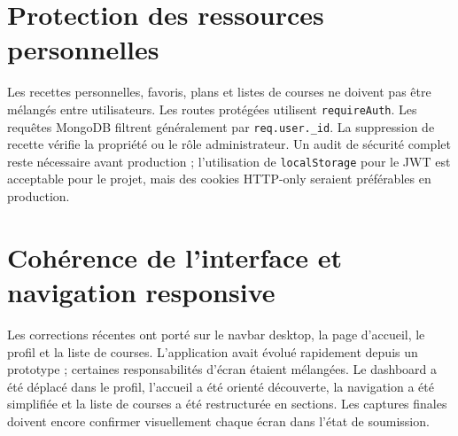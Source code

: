 \documentclass[12pt,a4paper]{report}
\begin{document}
\section{Protection des ressources personnelles}
Les recettes personnelles, favoris, plans et listes de courses ne doivent pas être mélangés entre utilisateurs. Les routes protégées utilisent \texttt{requireAuth}. Les requêtes MongoDB filtrent généralement par \texttt{req.user.\_id}. La suppression de recette vérifie la propriété ou le rôle administrateur. Un audit de sécurité complet reste nécessaire avant production ; l'utilisation de \texttt{localStorage} pour le JWT est acceptable pour le projet, mais des cookies HTTP-only seraient préférables en production.

\section{Cohérence de l'interface et navigation responsive}
Les corrections récentes ont porté sur le navbar desktop, la page d'accueil, le profil et la liste de courses. L'application avait évolué rapidement depuis un prototype ; certaines responsabilités d'écran étaient mélangées. Le dashboard a été déplacé dans le profil, l'accueil a été orienté découverte, la navigation a été simplifiée et la liste de courses a été restructurée en sections. Les captures finales doivent encore confirmer visuellement chaque écran dans l'état de soumission.
\end{document}
